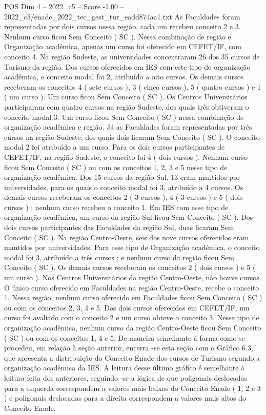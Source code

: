 \begin{textsample}{POS Dim 4 – 2022\_c5 – Score -1.00 – 2022\_c5/enade\_2022\_tec\_gest\_tur\_eadd874aa1.txt}
As Faculdades foram representadas por dois cursos nessa região, cada um recebeu conceito 2 e 3.
Nenhum curso ficou Sem Conceito ( SC ).
Nessa combinação de região e Organização acadêmica, apenas um curso foi oferecido em CEFET/IF, com conceito 4.
Na região Sudeste, as universidades concentraram 26 dos 35 cursos de Turismo da região.
Dos cursos oferecidos em IES com este tipo de organização acadêmica, o conceito modal foi 2, atribuído a oito cursos.
Os demais cursos receberam os conceitos 4 ( sete cursos ), 3 ( cinco cursos ), 5 ( quatro cursos ) e 1 ( um curso ).
Um curso ficou Sem Conceito ( SC ).
Os Centros Universitários participaram com quatro cursos na região Sudeste, dos quais três obtiveram o conceito modal 3.
Um curso ficou Sem Conceito ( SC ) nessa combinação de organização acadêmica e região.
Já as Faculdades foram representadas por três cursos na região Sudeste, dos quais dois ficaram Sem Conceito ( SC ).
O conceito modal 2 foi atribuído a um curso.
Para os dois cursos participantes de CEFET/IF, na região Sudeste, o conceito foi 4 ( dois cursos ).
Nenhum curso ficou Sem Conceito ( SC ) ou com os conceitos 1, 2, 3 e 5 nesse tipo de organização acadêmica.
Dos 15 cursos da região Sul, 13 eram mantidos por universidades, para os quais o conceito modal foi 3, atribuído a 4 cursos.
Os demais cursos receberam os conceitos 2 ( 3 cursos ), 4 ( 3 cursos ) e 5 ( dois cursos ) ; nenhum curso recebeu o conceito 1.
Em IES com esse tipo de organização acadêmica, um curso da região Sul ficou Sem Conceito ( SC ).
Dos dois cursos participantes das Faculdades da região Sul, duas ficaram Sem Conceito ( SC ).
Na região Centro-Oeste, seis dos nove cursos oferecidos eram mantidos por universidades.
Para esse tipo de Organização acadêmica, o conceito modal foi 3, atribuído a três cursos ; e nenhum curso da região ficou Sem Conceito ( SC ).
Os demais cursos receberam os conceitos 2 ( dois cursos ) e 5 ( um curso ).
Nos Centros Universitários da região Centro-Oeste, não houve cursos.
O único curso oferecido em Faculdades na região Centro-Oeste, recebe o conceito 1.
Nessa região, nenhum curso oferecido em Faculdades ficou Sem Conceito ( SC ) ou com os conceitos 2, 3, 4 e 5.
Dos dois cursos oferecidos em CEFET/IF, um curso foi avaliado com o conceito 2 e um curso obteve o conceito 3.
Nesse tipo de organização acadêmica, nenhum curso da região Centro-Oeste ficou Sem Conceito ( SC ) ou com os conceitos 1, 4 e 5.
De maneira semelhante à forma como se procedeu, em relação à seção anterior, encerra -se esta seção com o Gráfico 6.3, que apresenta a distribuição do Conceito Enade dos cursos de Turismo segundo a organização acadêmica da IES.
A leitura desse último gráfico é semelhante à leitura feita dos anteriores, seguindo -se a lógica de que poligonais deslocadas para a esquerda correspondem a valores mais baixos do Conceito Enade ( 1, 2 e 3 ) e poligonais deslocadas para a direita correspondem a valores mais altos do Conceito Enade.

\end{textsample}
